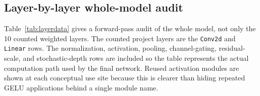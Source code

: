 \documentclass[11pt]{article}
\begin{document}
\subsection{Layer-by-layer whole-model audit}

Table~\ref{tab:layerdata} gives a forward-pass audit of the whole model, not only the
10 counted weighted layers. The counted project layers are the \texttt{Conv2d} and
\texttt{Linear} rows. The normalization, activation, pooling, channel-gating,
residual-scale, and stochastic-depth rows are included so the table represents the
actual computation path used by the final network. Reused activation modules are
shown at each conceptual use site because this is clearer than hiding repeated GELU
applications behind a single module name.


\begingroup
\scriptsize
\renewcommand{\arraystretch}{1.08}
\setlength{\tabcolsep}{2pt}
\end{document}
